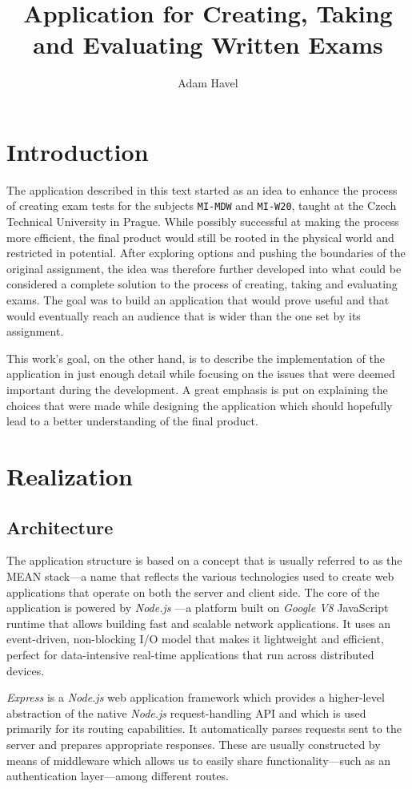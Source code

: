 \documentclass[thesis=M,english,hidelinks]{FITthesis}[2012/10/20]
\title{Application for Creating, Taking and Evaluating Written Exams}
\author{Adam Havel}
\newcommand{\code}{\texttt}
\begin{document}
\chapter{Introduction}

The application described in this text started as an idea to enhance the process of creating exam tests for the subjects \code{MI-MDW} and \code{MI-W20}, taught at the Czech Technical University in Prague. While possibly successful at making the process more efficient, the final product would still be rooted in the physical world and restricted in potential. After exploring options and pushing the boundaries of the original assignment, the idea was therefore further developed into what could be considered a complete solution to the process of creating, taking and evaluating exams. The goal was to build an application that would prove useful and that would eventually reach an audience that is wider than the one set by its assignment.

This work's goal, on the other hand, is to describe the implementation of the application in just enough detail while focusing on the issues that were deemed important during the development. A great emphasis is put on explaining the choices that were made while designing the application which should hopefully lead to a better understanding of the final product.


\chapter{Realization}

  \section{Architecture}

The application structure is based on a concept that is usually referred to as the MEAN stack---a name that reflects the various technologies used to create web applications that operate on both the server and client side. The core of the application is powered by \textit{Node.js} \cite{node}---a platform built on \textit{Google V8} JavaScript runtime that allows building fast and scalable network applications. It uses an event-driven, non-blocking I/O model that makes it lightweight and efficient, perfect for data-intensive real-time applications that run across distributed devices.

\textit{Express} \cite{express} is a \textit{Node.js} web application framework which provides a higher-level abstraction of the native \textit{Node.js} request-handling API and which is used primarily for its routing capabilities. It automatically parses requests sent to the server and prepares appropriate responses. These are usually constructed by means of middleware which allows us to easily share functionality---such as an authentication layer---among different routes.
\end{document}
